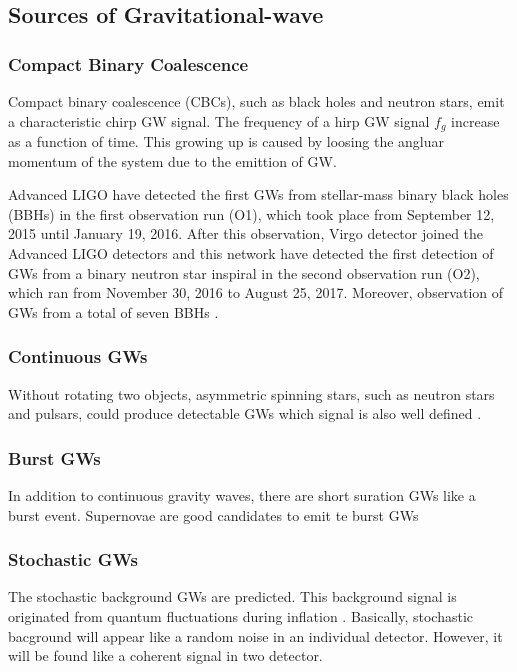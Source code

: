
\subsection{Sources of Gravitational-wave}
\subsubsection{Compact Binary Coalescence}
Compact binary coalescence (CBCs), such as black holes and neutron stars, emit a characteristic chirp GW signal. The frequency of a hirp GW signal $f_{g}$ increase as a function of time. This growing up is caused by loosing the angluar momentum of the system due to the emittion of GW. 

Advanced LIGO have detected the first GWs from stellar-mass binary black holes (BBHs) in the first observation run (O1), which took place from September 12, 2015 until January 19, 2016. After this observation, Virgo detector joined the Advanced LIGO detectors and this network have detected the first detection of GWs from a binary neutron star inspiral in the second observation run (O2), which ran from November 30, 2016 to August 25, 2017. Moreover, observation of GWs from a total of seven BBHs \cite{abbott2019gwtc}.


\subsubsection{Continuous GWs}
Without rotating two objects, asymmetric spinning stars, such as neutron stars and pulsars, could produce detectable GWs which signal is also well defined \cite{leaci2012searching,hereld1984search}.

\subsubsection{Burst GWs}
In addition to continuous gravity waves, there are short suration GWs like a burst event. Supernovae are good candidates to emit te burst GWs \cite{ott2004gravitational}

\subsubsection{Stochastic GWs}
The stochastic background GWs are predicted\cite{starobinskii1979spectrum,Christensen_2018}. This background signal is originated from quantum fluctuations during inflation \cite{PhysRevD.23.347}. Basically, stochastic bacground will appear like a random noise in an individual detector. However, it will be found like a coherent signal in two detector.

